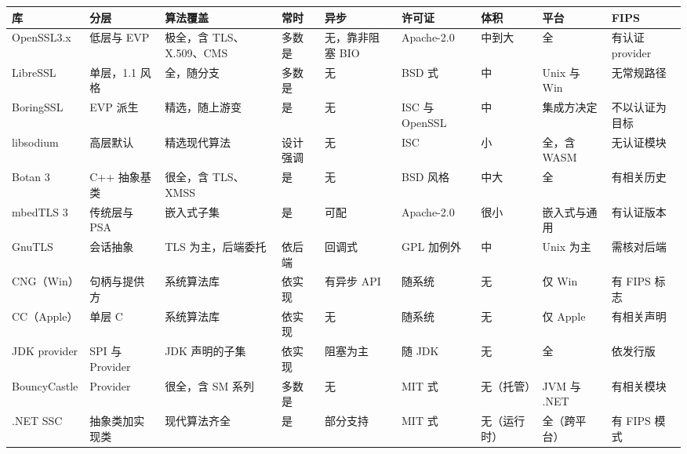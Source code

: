 \documentclass[12pt,a4paper,fontset=fandol]{ctexbook}
\begin{document}
\begin{scriptsize}
\setlength{\tabcolsep}{2pt}
\begin{longtable}{@{}>{\raggedright\arraybackslash}p{}
                  >{\raggedright\arraybackslash}p{}
                  >{\raggedright\arraybackslash}p{}
                  >{\raggedright\arraybackslash}p{}
                  >{\raggedright\arraybackslash}p{}
                  >{\raggedright\arraybackslash}p{}
                  >{\raggedright\arraybackslash}p{}
                  >{\raggedright\arraybackslash}p{}
                  >{\raggedright\arraybackslash}p{}@{}}
\toprule
\textbf{库} & \textbf{分层} & \textbf{算法覆盖} & \textbf{常时} &
\textbf{异步} & \textbf{许可证} & \textbf{体积} & \textbf{平台} &
\textbf{FIPS} \\
\midrule
OpenSSL\allowbreak 3.x & 低层与 EVP & 极全，含 TLS、X.509、CMS &
多数是 & 无，靠非阻塞 BIO & Apache-2.0 & 中到大 & 全 &
有认证 provider \\
\addlinespace
LibreSSL & 单层，1.1 风格 & 全，随分支 & 多数是 & 无 & BSD 式 & 中 &
Unix 与 Win & 无常规路径 \\
\addlinespace
BoringSSL & EVP 派生 & 精选，随上游变 & 是 & 无 & ISC 与 OpenSSL & 中 &
集成方决定 & 不以认证为目标 \\
\addlinespace
libsodium & 高层默认 & 精选现代算法 & 设计强调 & 无 & ISC & 小 &
全，含 WASM & 无认证模块 \\
\addlinespace
Botan 3 & C++ 抽象基类 & 很全，含 TLS、XMSS & 是 & 无 & BSD 风格 & 中大 &
全 & 有相关历史 \\
\addlinespace
mbedTLS 3 & 传统层与 PSA & 嵌入式子集 & 是 & 可配 & Apache-2.0 &
很小 & 嵌入式与通用 & 有认证版本 \\
\addlinespace
GnuTLS & 会话抽象 & TLS 为主，后端委托 & 依后端 & 回调式 & GPL 加例外 & 中 &
Unix 为主 & 需核对后端 \\
\addlinespace
CNG（Win） & 句柄与提供方 & 系统算法库 & 依实现 & 有异步 API & 随系统 &
无 & 仅 Win & 有 FIPS 标志 \\
\addlinespace
CC（Apple） & 单层 C & 系统算法库 & 依实现 & 无 & 随系统 & 无 &
仅 Apple & 有相关声明 \\
\addlinespace
JDK provider & SPI 与 Provider & JDK 声明的子集 & 依实现 & 阻塞为主 &
随 JDK & 无 & 全 & 依发行版 \\
\addlinespace
Bouncy\allowbreak Castle & Provider & 很全，含 SM 系列 & 多数是 & 无 &
MIT 式 & 无（托管） & JVM 与 .NET & 有相关模块 \\
\addlinespace
.NET SSC & 抽象类加实现类 & 现代算法齐全 & 是 & 部分支持 & MIT 式 &
无（运行时） & 全（跨平台） & 有 FIPS 模式 \\
\bottomrule
\end{longtable}
\setlength{\tabcolsep}{6pt}
\end{scriptsize}
\end{document}
